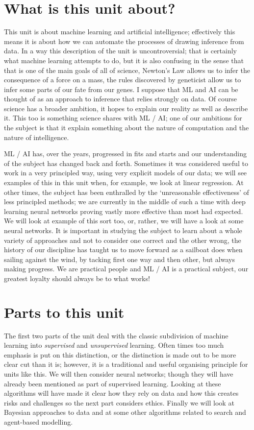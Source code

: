 \documentclass[12pt]{article}
\begin{document}
\section*{What is this unit about?} 
This unit is about machine learning and artificial intelligence;
effectively this means it is about how we can automate the processes
of drawing inference from data. In a way this description of the unit
is uncontroversial; that is certainly what machine learning attempts
to do, but it is also confusing in the sense that that is one of the
main goals of all of science, Newton's Law allows us to infer the
consequence of a force on a mass, the rules discovered by geneticist
allow us to infer some parts of our fate from our genes. I suppose
that ML and AI can be thought of as an approach to inference that
relies strongly on data. Of course science has a broader ambition, it
hopes to explain our reality as well as describe it. This too is
something science shares with ML / AI; one of our ambitions for the
subject is that it explain something about the nature of computation
and the nature of intelligence.

ML / AI has, over the years, progressed in fits and starts and our
understanding of the subject has changed back and forth. Sometimes it
was considered useful to work in a very principled way, using very
explicit models of our data; we will see examples of this in this unit
when, for example, we look at linear regression. At other times, the
subject has been enthralled by the `unreasonable effectiveness' of
less principled methods; we are currently in the middle of such a time
with deep learning neural networks proving vastly more effective than
most had expected. We will look at example of this sort too, or,
rather, we will have a look at some neural networks. It is important
in studying the subject to learn about a whole variety of approaches
and not to consider one correct and the other wrong, the history of
our discipline has taught us to move forward as a sailboat does when
sailing against the wind, by tacking first one way and then other, but
always making progress. We are practical people and ML / AI is a
practical subject, our greatest loyalty should always be to what
works!


\section{Parts to this unit}

The first two parts of the unit deal with the classic subdivision of
machine learning into \textsl{supervised} and \textsl{unsupervised}
learning. Often times too much emphasis is put on this distinction, or
the distinction is made out to be more clear cut than it is; however,
it is a traditional and useful organising principle for units like
this. We will then consider neural networks; though they will have
already been mentioned as part of supervised learning. Looking at
these algorithms will have made it clear how they rely on data and how
this creates risks and challenges so the next part considers
ethics. Finally we will look at Bayesian approaches to data and at
some other algorithms related to search and agent-based modelling.
\end{document}
